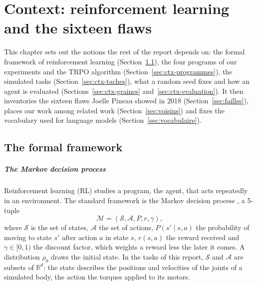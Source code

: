 \chapter{Context: reinforcement learning and the sixteen flaws}\label{chap:02-contexte}

This chapter sets out the notions the rest of the report depends on: the formal framework of
reinforcement learning (Section~\ref{sec:cadre}), the four programs of our experiments and the TRPO
algorithm (Section~\ref{sec:ctx-programmes}), the simulated tasks (Section~\ref{sec:ctx-taches}), what
a random seed fixes and how an agent is evaluated (Sections~\ref{sec:ctx-graines}
and~\ref{sec:ctx-evaluation}). It then inventories the sixteen flaws Joelle Pineau showed in 2018
(Section~\ref{sec:failles}), places our work among related work (Section~\ref{sec:voisins}) and fixes
the vocabulary used for language models (Section~\ref{sec:vocabulaire}).

\section{The formal framework}\label{sec:cadre}

\paragraph{The Markov decision process}
Reinforcement learning (RL) studies a program, the agent, that acts repeatedly in an environment. The
standard framework is the Markov decision process \parencite{puterman1994mdp,sutton2018rl}, a 5-tuple
\begin{equation}
  \mathcal{M} = (\mathcal{S}, \mathcal{A}, P, r, \gamma),
\end{equation}
where $\mathcal{S}$ is the set of states, $\mathcal{A}$ the set of actions, $P(s' \mid s, a)$ the
probability of moving to state $s'$ after action $a$ in state $s$, $r(s, a)$ the reward received and
$\gamma \in [0, 1)$ the discount factor, which weights a reward less the later it comes. A distribution $\rho_0$ draws
the initial state. In the tasks of this report, $\mathcal{S}$ and $\mathcal{A}$ are subsets of
$\mathbb{R}^d$: the state describes the positions and velocities of the joints of a simulated body,
the action the torques applied to its motors.

